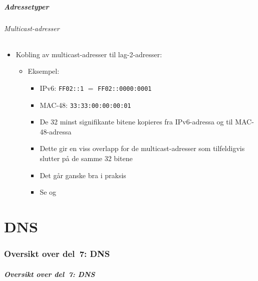 \begin{frame}
  \frametitle{Adressetyper}
  \framesubtitle{Multicast-adresser}
  \begin{itemize}
  \item Kobling av multicast-adresser til lag-2-adresser:
    \begin{itemize}
    \item Eksempel:
      \begin{itemize}
      \item IPv6: \texttt{FF02::1} \(=\)
        \texttt{FF02::\alert{0000}:\alert{0001}}
      \item MAC-48:
        \texttt{33:33:\alert{00}:\alert{00}:\alert{00}:\alert{01}}
      \item De 32 minst signifikante bitene kopieres fra IPv6-adressa
        og til MAC-48-adressa
      \item Dette gir en viss overlapp for de multicast-adresser som
        tilfeldigvis slutter på de samme 32 bitene
      \item Det går ganske bra i praksis
      \item Se  og 
      \end{itemize}
    \end{itemize}
  \end{itemize}
\end{frame}

\part{DNS}

\begin{frame}
  \partpage
\end{frame}

\section*{Oversikt over del~7: DNS}
\begin{frame}[allowframebreaks]
  \frametitle{Oversikt over del~7: DNS}
    \tableofcontents
\end{frame}


